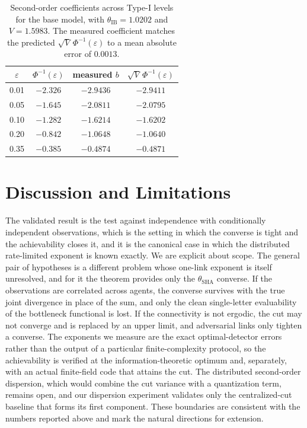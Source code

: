 \documentclass[journal]{IEEEtran}
\theoremstyle{definition}
\theoremstyle{remark}
\newcommand{\tib}{\theta_{\mathrm{IB}}}
\newcommand{\tsha}{\theta_{\mathrm{SHA}}}
\begin{document}
\begin{table}[t]
\centering
\caption{Second-order coefficients across Type-I levels for the base model, with $\tib=1.0202$ and $V=1.5983$. The
measured coefficient matches the predicted $\sqrt V\,\Phi^{-1}(\varepsilon)$ to a mean absolute error of $0.0013$.}
\label{tab:dispersion}
\renewcommand{\arraystretch}{1.15}
\begin{tabular}{@{}cccc@{}}
\toprule
$\varepsilon$ & $\Phi^{-1}(\varepsilon)$ & measured $b$ & $\sqrt V\,\Phi^{-1}(\varepsilon)$ \\
\midrule
0.01 & $-2.326$ & $-2.9436$ & $-2.9411$ \\
0.05 & $-1.645$ & $-2.0811$ & $-2.0795$ \\
0.10 & $-1.282$ & $-1.6214$ & $-1.6202$ \\
0.20 & $-0.842$ & $-1.0648$ & $-1.0640$ \\
0.35 & $-0.385$ & $-0.4874$ & $-0.4871$ \\
\bottomrule
\end{tabular}
\end{table}

\section{Discussion and Limitations}\label{sec:discussion}
The validated result is the test against independence with conditionally independent observations, which is the
setting in which the converse is tight and the achievability closes it, and it is the canonical case in which the
distributed rate-limited exponent is known exactly. We are explicit about scope. The general pair of hypotheses is
a different problem whose one-link exponent is itself unresolved, and for it the theorem provides only the $\tsha$
converse. If the observations are correlated across agents, the converse survives with the true joint divergence
in place of the sum, and only the clean single-letter evaluability of the bottleneck functional is lost. If the
connectivity is not ergodic, the cut may not converge and is replaced by an upper limit, and adversarial links
only tighten a converse. The exponents we measure are the exact optimal-detector errors rather than the output of
a particular finite-complexity protocol, so the achievability is verified at the information-theoretic optimum and,
separately, with an actual finite-field code that attains the cut. The distributed second-order dispersion, which
would combine the cut variance with a quantization term, remains open, and our dispersion experiment validates
only the centralized-cut baseline that forms its first component. These boundaries are consistent with the numbers
reported above and mark the natural directions for extension.
\end{document}
